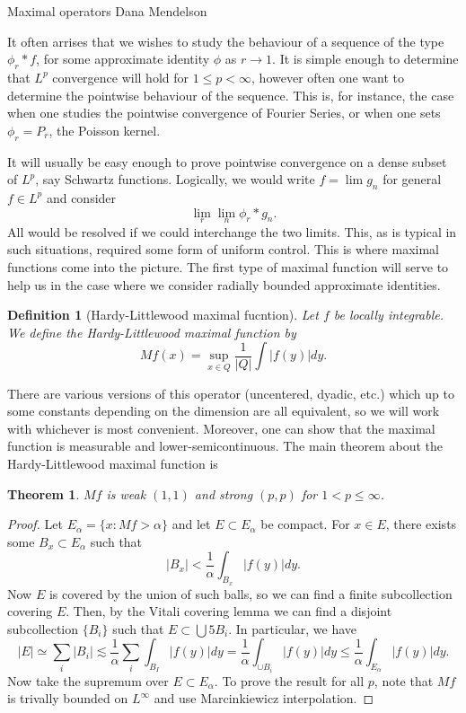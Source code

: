 \documentclass[11pt]{article}
\newtheorem{thm}{Theorem}
\newtheorem*{defn}{Definition}
\theoremstyle{remark}
\newcommand{\1}{\textbf{1}}
\newcommand{\lle}{\lesssim}
\begin{document}
{\noindent\Large Maximal operators \hfill Dana Mendelson}
\vspace{4mm}

It often arrises that we wishes to study the behaviour of a sequence of the type $\phi_r * f$, for some approximate identity $\phi$ as $r \to 1$. It is simple enough to determine that $L^p$ convergence will hold for $1 \leq p < \infty$, however often one want to determine the pointwise behaviour of the sequence. This is, for instance, the case when one studies the pointwise convergence of Fourier Series, or when one sets $\phi_r = P_r$, the Poisson kernel. 

It will usually be easy enough to prove pointwise convergence on a dense subset of $L^p$, say Schwartz functions. Logically, we would write $f = \lim g_n$ for general $f \in L^p$ and consider
\[
\lim_r \lim_n \phi_r * g_n.
\]
All would be resolved if we could interchange the two limits. This, as is typical in such situations, required some form of uniform control. This is where maximal functions come into the picture. The first type of maximal function will serve to help us in the case where we consider radially bounded approximate identities.
\begin{defn}[Hardy-Littlewood maximal fucntion]
Let $f$ be locally integrable. We define the Hardy-Littlewood maximal function by
\[
Mf(x) = \sup_{x \in Q} \frac{1}{|Q|} \int |f(y)| dy.
\]
\end{defn}
There are various versions of this operator (uncentered, dyadic, etc.) which up to some constants depending on the dimension are all equivalent, so we will work with whichever is most convenient. Moreover, one can show that the maximal function is measurable and lower-semicontinuous. The main theorem about the Hardy-Littlewood maximal function is 
\begin{thm}
$Mf$ is weak $(1,1)$ and strong $(p,p)$ for $1 < p \leq \infty$. 
\end{thm}
\begin{proof}
Let $E_\alpha = \{x : Mf > \alpha\}$ and let $E \subset E_\alpha$ be compact. For $x \in E$, there exists some $B_x \subset E_\alpha$ such that
\[
|B_x| < \frac{1}{\alpha} \int_{B_x} |f(y)| dy.
\]
Now $E$ is covered by the union of such balls, so we can find a finite subcollection covering $E$. Then, by the Vitali covering lemma we can find a disjoint subcollection $\{B_i\}$ such that $E \subset \bigcup 5B_i$. In particular, we have
\[
|E | \simeq \sum_{i} |B_i| \lle \frac{1}{\alpha} \sum_i \int_{B_I} |f(y)| dy = \frac{1}{\alpha} \int_{\cup B_i} |f(y)| dy \leq \frac{1}{\alpha} \int_{E_\alpha} |f(y)| dy.
\]
Now take the supremum over $E \subset E_\alpha$. To prove the result for all $p$, note that $Mf$ is trivally bounded on $L^\infty$ and use Marcinkiewicz interpolation.
\end{proof}
\end{document}
